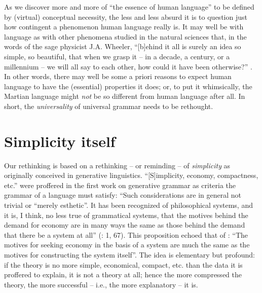 \documentclass[output=paper]{langsci/langscibook}
\begin{document}
As we discover more and more of “the essence of human language” to be defined
by (virtual) conceptual necessity, the less and less absurd it is to question
just how contingent a phenomenon human language really is. It may well be with
language as with other phenomena studied in the natural sciences that, in the
words of the sage physicist J.A. Wheeler, “[b]ehind it all is surely an idea so
simple, so beautiful, that when we grasp it – in a decade, a century, or a
millennium – we will all say to each other, how could it have been otherwise?”
\citep[386]{Wheeler1986}. In other words, there may well be some a
priori reasons to expect human language to have the (essential) properties it
does; or, to put it whimsically, the Martian language might \emph{not} be so
different from human language after all. In short, the \emph{universality} of
universal grammar needs to be rethought.

\section{Simplicity itself}

Our rethinking is based on a rethinking – or reminding – of \emph{simplicity}
as originally conceived in generative linguistics. “[S]implicity, economy,
compactness, etc.” were proffered in the first work on generative grammar as
criteria the grammar of a language must satisfy: “Such considerations are in
general not trivial or \enquote{merely esthetic}. It has been recognized of
philosophical systems, and it is, I think, no less true of grammatical systems,
that the motives behind the demand for economy are in many ways the same as
those behind the demand that there be a system at all” (\citealt{Chomsky1951}:
1, 67). This proposition echoed that of \citet[107]{Goodman1943}: “The motives
for seeking economy in the basis of a system are much the same as the motives
for constructing the system itself”. The idea is elementary but profound: if
the theory is no more simple, economical, compact, etc. than the data it is
proffered to explain, it is not a theory at all; hence the more compressed the
theory, the more successful – i.e., the more explanatory – it is.
\end{document}
